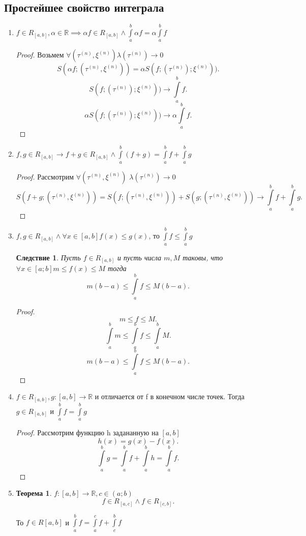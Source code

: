 \documentclass{scrartcl}
\newtheorem{theorem}{Теорема}
\newtheorem{corollary}{Следствие}[theorem]
\begin{document}
\subsection{Простейшее свойство интеграла}
\begin{enumerate}
    \item $f \in R_{[a,b]} , \alpha \in \mathbb{R} \implies \alpha f \in R_{[a,b]} \land \int\limits_{a}^{b} \alpha f = \alpha \int\limits_{a}^{b} f 
    $
    \begin{proof}
        Возьмем $\forall (\tau^{(n)}, \xi^{(n)}) \lambda(\tau^{(n)})\to 0$ 
        \[
        S(\alpha f; (\tau^{(n)}, \xi^{(n)})) = \alpha S(f;(\tau^{(n)});\xi^{(n)}))
        .\] 
        \[
        S(f;(\tau^{(n)});\xi^{(n)})) \to \int\limits_{a}^{b} f 
        .\] 
        \[
        \alpha S(f;(\tau^{(n)});\xi^{(n)})) \to \alpha \int\limits_{a}^{b} f 
        .\] 
    \end{proof}
\item
    $f,g \in R_{[a,b]} \to f + g \in R_{[a,b]} \land \int\limits_{a}^{b} (f + g) =
    \int\limits_{a}^{b} f +  \int\limits_{a}^{b} g 
    $
    \begin{proof}
        Рассмотрим $\forall (\tau^{(n)},\xi^{(n)})$  $\lambda(\tau^{(n)}) \to 0$ 
        \[ 
            S(f + g; (\tau^{(n)},\xi^{(n)})) = S(f;(\tau^{(n)},\xi^{(n)})) +
S(g;(\tau^{(n)},\xi^{(n)})) \to \int\limits_{a}^{b} f +  \int\limits_{a}^{b} g 
        .\] 
    \end{proof}
\item 
    $f, g \in R_{[a,b]} \land \forall  x \in [a,b] f(x) \le g(x)$, то
    $\int\limits_{a}^{b} f \le  \int\limits_{a}^{b} g 
    $
\begin{corollary}
    Пусть $f \in R_{[a,b]}$ и пусть числа $m,M$ таковы, что  $\forall  x \in [a;b] 
    m \le  f(x) \le  M$ тогда 
    \[
    m(b-a) \le  \int\limits_{a}^{b} f \le  M(b - a) 
    .\] 
\end{corollary}
\begin{proof}
    \[
    m \le  f \le  M
    .\] 
    \[
    \int\limits_{a}^{b} m \le  \int\limits_{a}^{b} f \le  \int\limits_{a}^{b}  M 
    .\] 
    \[
    m(b - a) \le  \int\limits_{a}^{b} f \le  M(b - a) 
    .\] 
\end{proof}
\item $f \in R_{[a,b]}, g : [a,b] \to \mathbb{R}$ и отличается от f в конечном числе точек. Тогда $g \in R_{[a,b]}$ и $\int\limits_{a}^{b} f = \int\limits_{a}^{b} g 
$ 
\begin{proof}
    Рассмотрим функцию h задананную на $[a,b]$
     \[
    h(x) =  g(x) - f(x)
    .\] 
    \[
    \int\limits_{a}^{b} g = \int\limits_{a}^{b} f + \int\limits_{a}^{b} h = \int\limits_{a}^{b} f  
    .\] 
\end{proof}
\item 
    \begin{theorem}
        $f:[a,b] \to \mathbb{R} , c\in (a;b)$
        \[
            f \in R_{[a,c]} \land f \in R_{[c,b]}
        .\] 
    \end{theorem}
    То  $f \in R[a,b]$ и  $\int\limits_{a}^{b} f = \int\limits_{a}^{c } f + \int\limits_{c}^{b} f$ 
\end{enumerate}
\end{document}
